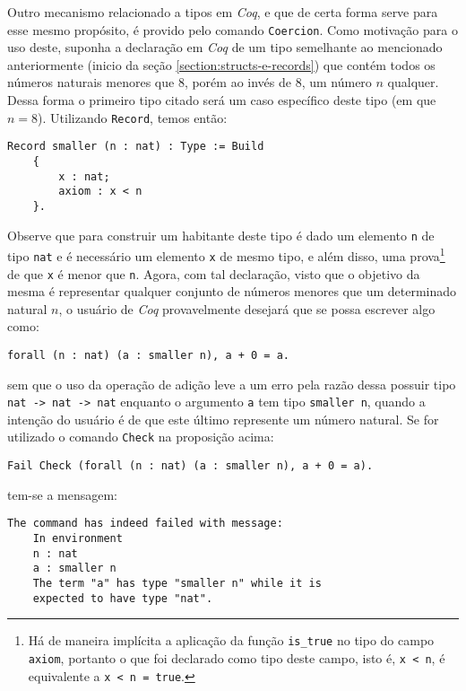 Outro mecanismo relacionado a tipos em \textit{Coq}, e que de certa forma serve para esse mesmo propósito, é provido pelo comando \lstinline[language = coq]$Coercion$. Como motivação para o uso deste, suponha a declaração em \textit{Coq} de um tipo semelhante ao mencionado anteriormente (inicio da seção \ref{section:structs-e-records}) que contém todos os números naturais menores que $8$, porém ao invés de $8$, um número $n$ qualquer. Dessa forma o primeiro tipo citado será um caso específico deste tipo (em que $n = 8$). Utilizando \lstinline[language = coq]$Record$, temos então: 
\begin{lstlisting}[language = coq]
    Record smaller (n : nat) : Type := Build
    {
        x : nat;
        axiom : x < n
    }.
\end{lstlisting}
Observe que para construir um habitante deste tipo é dado um elemento \lstinline[language = coq]$n$ de tipo \lstinline[language = coq]$nat$ e é necessário um elemento \lstinline[language = coq]$x$ de mesmo tipo, e além disso, uma prova\footnote{Há de maneira implícita a aplicação da função \lstinline[language = coq]$is_true$ no tipo do campo \lstinline[language = coq]$axiom$, portanto o que foi declarado como tipo deste campo, isto é, \lstinline[language = coq]$x < n$, é equivalente a \lstinline[language = coq]$x < n = true$.} de que \lstinline[language = coq]$x$ é menor que \lstinline[language = coq]$n$.
Agora, com tal declaração, visto que o objetivo da mesma é representar qualquer conjunto de números menores que um determinado natural $n$, o usuário de \textit{Coq} provavelmente desejará que se possa escrever algo como:
\begin{lstlisting}[language = coq]
    forall (n : nat) (a : smaller n), a + 0 = a.
\end{lstlisting}
sem que o uso da operação de adição leve a um erro pela razão dessa possuir tipo \lstinline[language = coq]$nat -> nat -> nat$ enquanto o argumento \lstinline[language = coq]$a$ tem tipo \lstinline[language = coq]$smaller n$, quando a intenção do usuário é de que este último represente um número natural. Se for utilizado o comando \lstinline[language = coq]$Check$ na proposição acima:
\begin{lstlisting}[language = coq]
    Fail Check (forall (n : nat) (a : smaller n), a + 0 = a).
\end{lstlisting}
tem-se a mensagem:
\begin{lstlisting}[language = coq-error]
    The command has indeed failed with message:
    In environment
    n : nat
    a : smaller n
    The term "a" has type "smaller n" while it is
    expected to have type "nat".
\end{lstlisting}
